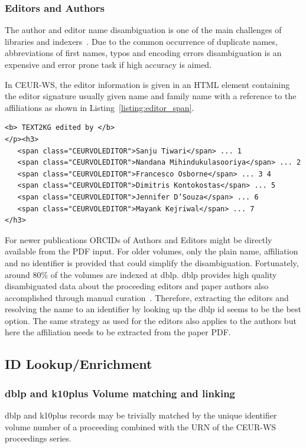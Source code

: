 \documentclass[]{ceurart}
\begin{document}
\subsubsection{Editors and Authors}
The author and editor name disambiguation is one of the main challenges of libraries and indexers~\cite{Subramanian_2021}.
Due to the common occurrence of duplicate names, abbreviations of first names, typos and encoding errors disambiguation is an expensive and error prone task if high accuracy is aimed.

In CEUR-WS, the editor information is given in an HTML element containing the editor signature usually given name and family name with a reference to the affiliations as shown in Listing~\ref{listing:editor_span}.
\begin{listing}
\caption{CEUR-WS volume page HTML markup excerpt of editor definition}
\label{listing:editor_span}
\begin{verbatim}
<b> TEXT2KG edited by </b>
</p><h3>
   <span class="CEURVOLEDITOR">Sanju Tiwari</span> ... 1
   <span class="CEURVOLEDITOR">Nandana Mihindukulasooriya</span> ... 2
   <span class="CEURVOLEDITOR">Francesco Osborne</span> ... 3 4
   <span class="CEURVOLEDITOR">Dimitris Kontokostas</span> ... 5
   <span class="CEURVOLEDITOR">Jennifer D’Souza</span> ... 6
   <span class="CEURVOLEDITOR">Mayank Kejriwal</span> ... 7
</h3>
\end{verbatim}

\end{listing}
For newer publications ORCIDs of Authors and Editors might be directly available from the PDF input.
For older volumes, only the plain name, affiliation and no identifier is provided that could simplify the disambiguation.
Fortunately, around 80\% of the volumes are indexed at dblp.
dblp provides high quality disambiguated data about the proceeding editors and paper authors also accomplished through manual curation~\cite{Kim_2018}.
Therefore, extracting the editors and resolving the name to an identifier by looking up the dblp id seems to be the best option.
The same strategy as used for the editors also applies to the authors but here the affiliation needs to be extracted from the paper PDF.

\subsection{ID Lookup/Enrichment}
\subsubsection{dblp and k10plus Volume matching and linking}
dblp and k10plus records may be trivially matched by the unique identifier volume number of a proceeding combined with the URN of the CEUR-WS proceedings series.
\end{document}
